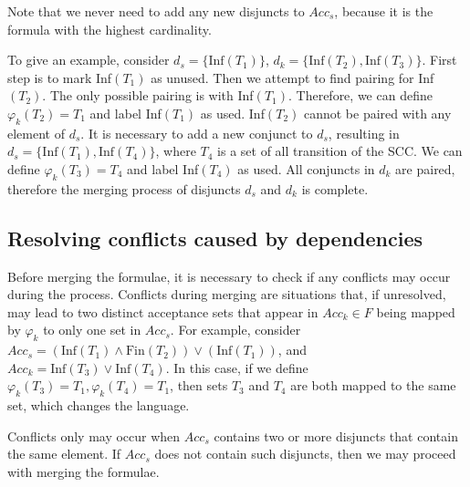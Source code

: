 \documentclass[
  digital, %
  twoside, %
  table,   %
  lof,     %
  lot,     %
]{fithesis3}
\begin{document}
Note that we never need to add any new disjuncts to  $Acc_s$, because it is the formula with the highest cardinality.

To give an example, consider $d_s = \{\text{Inf}(T_1)\}$, $d_k = \{\text{Inf}(T_2), \text{Inf}(T_3)\}$. First step is to mark Inf$(T_1)$ as unused. Then we attempt to find pairing for Inf$(T_2)$. The only possible pairing is with Inf$(T_1)$. Therefore, we can define $\varphi_k(T_2) = T_1$ and label Inf$(T_1)$ as used. Inf$(T_2)$ cannot be paired with any element of $d_s$. It is necessary to add a new conjunct to $d_s$, resulting in $d_s = \{\text{Inf}(T_1), \text{Inf}(T_4)\}$, where $T_4$ is a set of all transition of the SCC. We can define $\varphi_k(T_3) = T_4$ and label Inf$(T_4)$ as used. All conjuncts in $d_k$ are paired, therefore the merging process of disjuncts $d_s$ and $d_k$ is complete.

\subsection{Resolving conflicts caused by dependencies}
\label{subsec:resolve_conflicts}
Before merging the formulae, it is necessary to check if any conflicts may occur during the process. Conflicts during merging are situations that, if unresolved, may lead to two distinct acceptance sets that appear in $Acc_k \in F$ being mapped by $\varphi_k$ to only one set in $Acc_s$. For example, consider $Acc_s = (\text{Inf}(T_1) \wedge \text{Fin}(T_2)) \vee (\text{Inf}(T_1))$, and $Acc_k = \text{Inf}(T_3) \vee \text{Inf}(T_4)$. In this case, if we define $\varphi_k (T_3) = T_1, \varphi_k(T_4) = T_1$, then sets $T_3$ and $T_4$ are both mapped to the same set, which changes the language.   

Conflicts only may occur when $Acc_s$ contains two or more disjuncts that contain the same element. If $Acc_s$ does not contain such disjuncts, then we may proceed with merging the formulae. 
 
\end{document}
